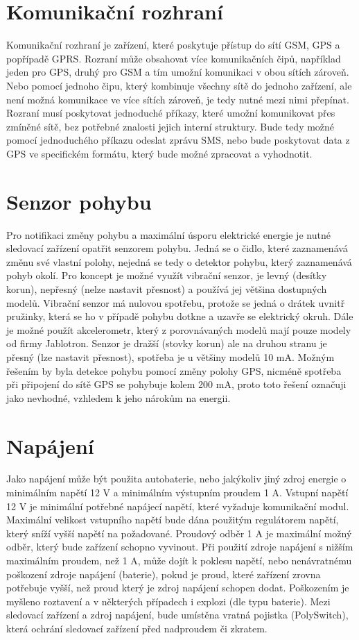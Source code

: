 \documentclass[FM,MP]{tulthesis}  %
\begin{document}
\section{Komunikační rozhraní}
Komunikační rozhraní je zařízení, které poskytuje přístup do sítí GSM, GPS a popřípadě GPRS. Rozraní může obsahovat více komunikačních čipů, například jeden pro GPS, druhý pro GSM a tím umožní komunikaci v obou sítích zároveň. Nebo pomocí jednoho čipu, který kombinuje všechny sítě do jednoho zařízení, ale není možná komunikace ve více sítích zároveň, je tedy nutné mezi nimi přepínat. Rozraní musí poskytovat jednoduché příkazy, které umožní komunikovat přes zmíněné sítě, bez potřebné znalosti jejich interní struktury. Bude tedy možné pomocí jednoduchého příkazu odeslat zprávu SMS, nebo bude poskytovat data z GPS ve specifickém formátu, který bude možné zpracovat a vyhodnotit.

\section{Senzor pohybu}
Pro notifikaci změny pohybu a maximální úsporu elektrické energie je nutné sledovací zařízení opatřit senzorem pohybu. Jedná se o čidlo, které zaznamenává změnu své vlastní polohy, nejedná se tedy o detektor pohybu, který zaznamenává pohyb okolí. Pro koncept je možné využít vibrační senzor, je levný (desítky korun), nepřesný (nelze nastavit přesnost) a používá jej většina dostupných modelů. Vibrační senzor má nulovou spotřebu, protože se jedná o drátek uvnitř pružinky, která se ho v případě pohybu dotkne a uzavře se elektrický okruh. Dále je možné použít akcelerometr, který z porovnávaných modelů mají pouze modely od firmy Jablotron. Senzor je dražší (stovky korun) ale na druhou stranu je přesný (lze nastavit přesnost), spotřeba je u většiny modelů 10 mA. Možným řešením by byla detekce pohybu pomocí změny polohy GPS, nicméně spotřeba při připojení do sítě GPS se pohybuje kolem 200 mA, proto toto řešení označuji jako nevhodné, vzhledem k jeho nárokům na energii.

\section{Napájení}
Jako napájení může být použita autobaterie, nebo jakýkoliv jiný zdroj energie o minimálním napětí 12 V a minimálním výstupním proudem 1 A. Vstupní napětí 12 V je minimální potřebné napájecí napětí, které vyžaduje komunikační modul. Maximální velikost vstupního napětí bude dána použitým regulátorem napětí, který sníží vyšší napětí na požadované. Proudový odběr 1 A je maximální možný odběr, který bude zařízení schopno vyvinout. Při použití zdroje napájení s nižším maximálním proudem, než 1 A, může dojít k poklesu napětí, nebo nenávratnému poškození zdroje napájení (baterie), pokud je proud, které zařízení zrovna potřebuje vyšší, než proud který je zdroj napájení schopen dodat. Poškozením je myšleno roztavení a v některých případech i explozi (dle typu baterie). Mezi sledovací zařízení a zdroj napájení, bude umístěna vratná pojistka (PolySwitch), která ochrání sledovací zařízení před nadproudem či zkratem. 
\end{document}
